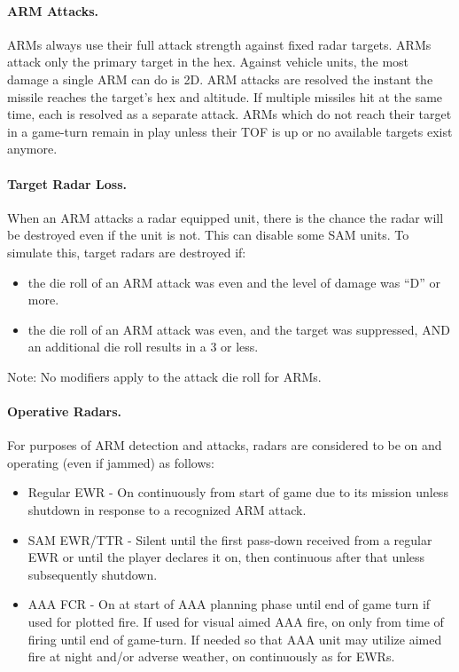 \paragraph{ARM Attacks.} ARMs always use their full attack strength against fixed radar targets. ARMs attack only the primary target in the hex. Against vehicle units, the most damage a single ARM can do is 2D. ARM attacks are resolved the instant the missile reaches the target's hex and altitude. If multiple missiles hit at the same time, each is resolved as a separate attack. ARMs which do not reach their target in a game-turn remain in play unless their TOF is up or no available targets exist anymore.

\paragraph{Target Radar Loss.}  When an ARM attacks a radar equipped unit, there is the chance the radar will be destroyed even if the unit is not. This can disable some SAM units. To simulate this, target radars are destroyed if:

\begin{itemize}
    \item the die roll of an ARM attack was even and the level of damage was “D” or more.

    \item the die roll of an ARM attack was even, and the target was suppressed, AND an additional die roll results in a 3 or less.
\end{itemize}

Note: No modifiers apply to the attack die roll for ARMs.

\paragraph{Operative Radars.} For purposes of ARM detection and attacks, radars are considered to be on and operating (even if jammed) as follows:

\begin{itemize}

    \item Regular EWR - On continuously from start of game due to its mission unless shutdown in response to a recognized ARM attack.

    \item SAM EWR/TTR - Silent until the first pass-down received from a regular EWR or until the player declares it on, then continuous after that unless subsequently shutdown.

    \item AAA FCR - On at start of AAA planning phase until end of game turn if used for plotted fire. If used for visual aimed AAA fire, on only from time of firing until end of game-turn. If needed so that AAA unit may utilize aimed fire at night and/or adverse weather, on continuously as for EWRs.

\end{itemize}

